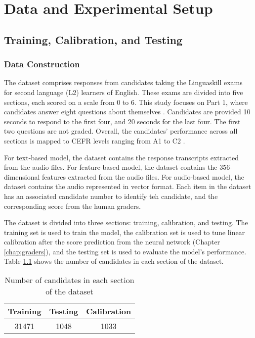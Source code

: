 \chapter{Data and Experimental Setup} \label{chap:setup}

\section{Training, Calibration, and Testing}

\subsection{Data Construction} \label{sec:data_construction}
The dataset comprises responses from candidates taking the Linguaskill exams for second language (L2)  learners of English. These exams are divided into five sections, each scored on a scale from 0 to 6. This study focuses on Part 1, where candidates answer eight questions about themselves \cite{linguaskills}. Candidates are provided 10 seconds to respond to the first four, and 20 seconds for the last four. The first two questions are not graded. Overall, the candidates' performance across all sections is mapped to CEFR levels ranging from A1 to C2 \cite{CEFR}.

For text-based model, the dataset contains the response transcripts extracted from the audio files. For feature-based model, the dataset contains the 356-dimensional features extracted from the audio files. For audio-based model, the dataset contains the audio represented in vector format. Each item in the dataset has an associated candidate number to identify teh candidate, and the corresponding score from the human graders.

The dataset is divided into three sections: training, calibration, and testing. The training set is used to train the model, the calibration set is used to tune linear calibration after the score prediction from the neural network (Chapter \ref{chap:graders}), and the testing set is used to evaluate the model's performance. Table \ref{tab:data_size} shows the number of candidates in each section of the dataset.

\begin{table}[H]
    \centering
    \begin{tabular}{|c|c|c|}
        \hline
        \textbf{Training} & \textbf{Testing} & \textbf{Calibration} \\ \hline
        31471             & 1048             & 1033                 \\ \hline
    \end{tabular}
    \caption{Number of candidates in each section of the dataset}
    \label{tab:data_size}
\end{table}

